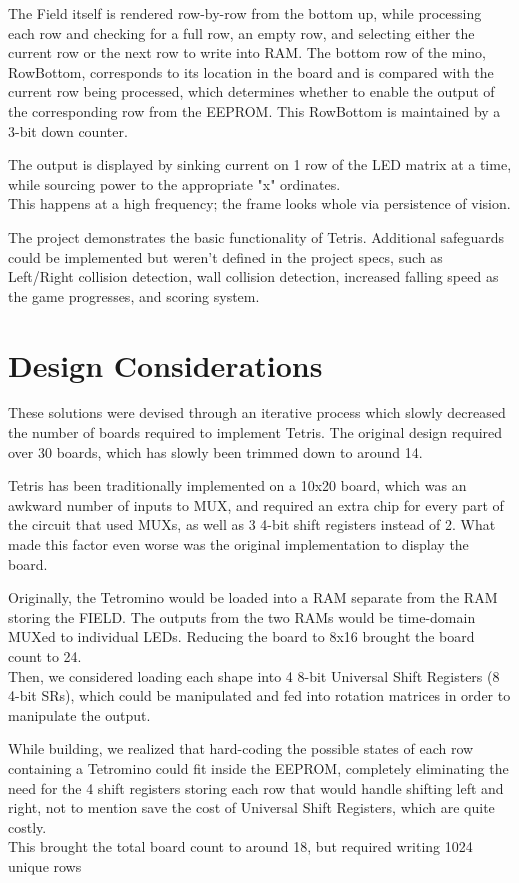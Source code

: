\documentclass[letterpaper,titlepage,&1&pt,oneside]{article}
\begin{document}
The Field itself is rendered row-by-row from the bottom up, while processing each row and checking for a full row, an empty row, and selecting either the current row or the next row to write into RAM. The bottom row of the mino, RowBottom, corresponds to its location in the board and is compared with the current row being processed, which determines whether to enable the output of the corresponding row from the EEPROM. This RowBottom is maintained by a 3-bit down counter.

The output is displayed by sinking current on 1 row of the LED matrix at a time, while sourcing power to the appropriate "x" ordinates. \\
This happens at a high frequency; the frame looks whole via persistence of vision.

The project demonstrates the basic functionality of Tetris. Additional safeguards could be implemented but weren't defined in the project specs, such as Left/Right collision detection, wall collision detection, increased falling speed as the game progresses, and scoring system.
\pagebreak
\section{Design Considerations}

These solutions were devised through an iterative process which slowly decreased the number of boards required to implement Tetris. The original design required over 30 boards, which has slowly been trimmed down to around 14. 

Tetris has been traditionally implemented on a 10x20 board, which was an awkward number of inputs to MUX, and required an extra chip for every part of the circuit that used MUXs, as well as 3 4-bit shift registers instead of 2. What made this factor even worse was the original implementation to display the board.

Originally, the Tetromino would be loaded into a RAM separate from the RAM storing the FIELD. The outputs from the two RAMs would be time-domain MUXed to individual LEDs. Reducing the board to 8x16 brought the board count to 24. \\
Then, we considered loading each shape into 4 8-bit Universal Shift Registers (8 4-bit SRs), which could be manipulated and fed into rotation matrices in order to manipulate the output. 

While building, we realized that hard-coding the possible states of each row containing a Tetromino could fit inside the EEPROM, completely eliminating the need for the 4 shift registers storing each row that would handle shifting left and right, not to mention save the cost of Universal Shift Registers, which are quite costly. \\
This brought the total board count to around 18, but required writing 1024 unique rows
\end{document}
